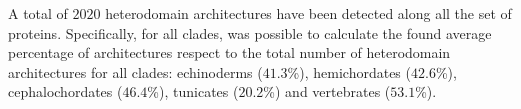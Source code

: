 \documentclass[11pt]{article}
\newcommand{\TODO}[1]{\begingroup\color{red}#1\endgroup}
\begin{document}
 





A total of $2020$ heterodomain architectures have been detected along all
the set of proteins. Specifically, for all clades, was possible to calculate 
the found average percentage of architectures respect to the total number of 
heterodomain architectures for all clades: echinoderms ($41.3$\%), 
hemichordates ($42.6$\%), cephalochordates ($46.4$\%), tunicates 
($20.2$\%) and vertebrates ($53.1$\%). 
\end{document}

